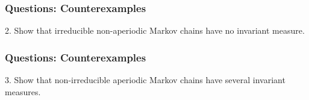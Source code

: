 \documentclass{beamer}
\begin{document}
\begin{frame}[t]
\frametitle{Questions: Counterexamples}
2. Show that irreducible non-aperiodic Markov chains have no invariant measure.
\pause
\end{frame}

\begin{frame}[t]
\frametitle{Questions: Counterexamples}
3. Show that non-irreducible aperiodic Markov chains have several invariant measures.
\pause
\end{frame}
\fi
\end{document}
